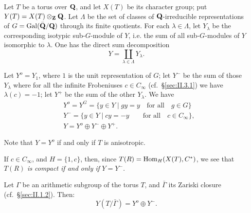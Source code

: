
Let $T$ be a torus over $\mathbf{Q}$, and let $X(T)$ be its character group; put
$Y(T)=X(T)\mathbin{\otimes}_{\mathbf{Z}}\mathbf{Q}$. Let $\Lambda$ be the set of classes of
$\mathbf{Q}$-irreducible representations of $G=\mathrm{Gal}(\bar{\mathbf{Q}}/\mathbf{Q})$ through its finite
quotients. For each $\lambda\in\Lambda$, let $Y_\lambda$ be the corresponding
isotypic sub-$G$-module of $Y$, i.e. the sum of all sub-$G$-modules of $Y$
isomorphic to $\lambda$. One has the direct sum decomposition
\[
Y=\coprod_{\lambda\in\Lambda} Y_\lambda.
\]

Let $Y^o=Y_1$, where $1$ is the unit representation of $G$; let $Y^-$ be the
sum of those $Y_\lambda$ where for all the infinite Frobeniuses
$c\in C_\infty$ (cf.~\S\ref{sec:II.3.1}) we have $\lambda(c)=-1$; let $Y^+$
be the sum of the other $Y_\lambda$. We have
\begin{align*}
&Y^o=Y^G=\{y\in Y \mid gy=y \quad\text{for all}\quad g\in G\}\\
&Y^-=\{y\in Y \mid cy=-y \qquad\text{for all}\quad c\in C_\infty\},\\
&Y=Y^o\oplus Y^-\oplus Y^+.
\end{align*}

Note that $Y=Y^o$ if and only if $T$ is anisotropic.

If $c\in C_\infty$, and $H=\{1,c\}$, then, since
$T(R)=\mathrm{Hom}_H(X(T),C^*)$, we see that $T(R)$ \emph{is compact if and only if}
$Y=Y^-$.

\begin{proposition}
Let $\Gamma$ be an arithmetic subgroup of the torus $T$, and $\bar{\Gamma}$
its Zariski closure (cf.~\S\ref{sec:II.1.2}). Then:
\begin{equation}
\tag{$*$}\label{eq:II.A.2.star}
Y(T/\bar{\Gamma})=Y^o\oplus Y^-.
\end{equation}

{}
\end{proposition}

